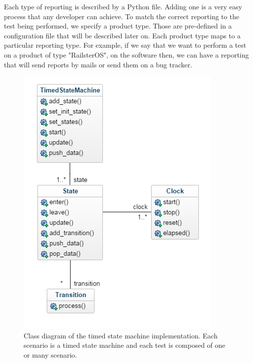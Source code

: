 \documentclass[12pt]{article}
\theoremstyle{definition}
\theoremstyle{definition}
\begin{document}
Each type of reporting is described by a Python file. Adding one is a very easy process that any developer can achieve. To match the correct reporting to the test being performed, we specify a product type. Those are pre-defined in a configuration file that will be described later on. Each product type maps to a particular reporting type. For example, if we say that we want to perform a test on a product of type "RailsterOS", on the software then, we can have a reporting that will send reports by mails or send them on a bug tracker.\\

\begin{figure}
    \centering
    \includegraphics[scale=0.8]{class_diagram.png}
    \caption{Class diagram of the timed state machine implementation. Each scenario is a timed state machine and each test is composed of one or many scenario.}
    \label{class_diagram}
\end{figure}
\end{document}
